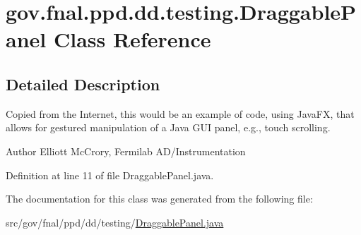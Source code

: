 \hypertarget{classgov_1_1fnal_1_1ppd_1_1dd_1_1testing_1_1DraggablePanel}{\section{gov.\-fnal.\-ppd.\-dd.\-testing.\-Draggable\-Panel Class Reference}
\label{classgov_1_1fnal_1_1ppd_1_1dd_1_1testing_1_1DraggablePanel}
}


\subsection{Detailed Description}
Copied from the Internet, this would be an example of code, using Java\-F\-X, that allows for gestured manipulation of a Java G\-U\-I panel, e.\-g., touch scrolling.

\begin{DoxyAuthor}{Author}
Elliott Mc\-Crory, Fermilab A\-D/\-Instrumentation 
\end{DoxyAuthor}


Definition at line 11 of file Draggable\-Panel.\-java.



The documentation for this class was generated from the following file\-:\begin{DoxyCompactItemize}
\item 
src/gov/fnal/ppd/dd/testing/\hyperlink{DraggablePanel_8java}{Draggable\-Panel.\-java}\end{DoxyCompactItemize}
